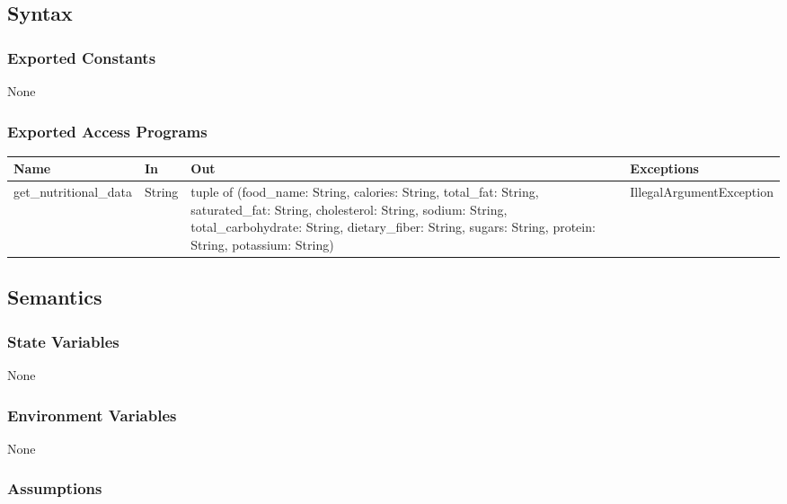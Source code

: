 \documentclass[12pt, titlepage]{article}
\begin{document}
\subsection{Syntax}

\subsubsection{Exported Constants}
None

\subsubsection{Exported Access Programs}

\begin{center}
	\begin{tabular}{p{4cm} p{2cm} p{5cm} p{4.5cm}}
		\hline
		\textbf{Name} & \textbf{In} & \textbf{Out} & \textbf{Exceptions} \\
		\hline
		get\_nutritional\_data & String & tuple of (food\_name: String, calories: String, total\_fat: String, saturated\_fat: String, cholesterol: String, sodium: String, total\_carbohydrate: String, dietary\_fiber: String, sugars: String, protein: String, potassium: String) & IllegalArgumentException \\
		\hline
	\end{tabular}
\end{center}

\subsection{Semantics}

\subsubsection{State Variables}

None

\subsubsection{Environment Variables}

None

\subsubsection{Assumptions}
\end{document}
